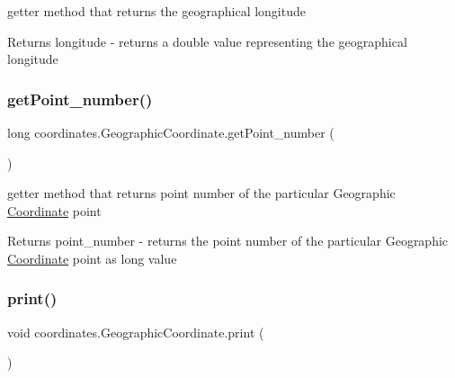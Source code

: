 getter method that returns the geographical longitude 

\begin{DoxyReturn}{Returns}
longitude -\/ returns a double value representing the geographical longitude 
\end{DoxyReturn}
\mbox{\label{classcoordinates_1_1_geographic_coordinate_a68208a97e0db4620dce1163bafdcab06}} 
\subsubsection{\texorpdfstring{get\+Point\+\_\+number()}{getPoint\_number()}}
{\footnotesize\ttfamily long coordinates.\+Geographic\+Coordinate.\+get\+Point\+\_\+number (\begin{DoxyParamCaption}{ }\end{DoxyParamCaption})}



getter method that returns point number of the particular Geographic \hyperlink{classcoordinates_1_1_coordinate}{Coordinate} point 

\begin{DoxyReturn}{Returns}
point\+\_\+number -\/ returns the point number of the particular Geographic \hyperlink{classcoordinates_1_1_coordinate}{Coordinate} point as long value 
\end{DoxyReturn}
\mbox{\label{classcoordinates_1_1_geographic_coordinate_a1cbf537f61d51979a831b2f018d28897}} 
\subsubsection{\texorpdfstring{print()}{print()}}
{\footnotesize\ttfamily void coordinates.\+Geographic\+Coordinate.\+print (\begin{DoxyParamCaption}{ }\end{DoxyParamCaption})}



